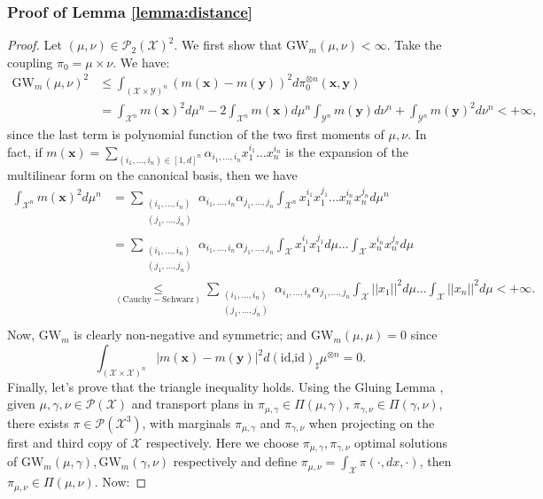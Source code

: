 \documentclass{article}
\newcommand{\Y}{\mathcal{Y}}
\newcommand{\X}{\mathcal{X}}
\newcommand{\1}{\mathbf{1}}
\newcommand{\GW}{\mathrm{GW}}
\renewcommand{\P}{\mathcal{P}}
\theoremstyle{definition}
\theoremstyle{remark}
\begin{document}
\begin{appendices}
\subsubsection*{Proof of Lemma \ref{lemma:distance}}
\begin{proof}Let $(\mu,\nu)\in 
    \P_2(\X)^2$. We first show that $\GW_m(\mu,\nu)<\infty$. Take the coupling $\pi_0 = \mu\times\nu$. We have:
    \begin{equation*}
        \begin{split}
            \GW_m(\mu,\nu)^2&\leq\int_{(\X\times\Y)^{n}}(m(\mathbf{x})-m(\mathbf{y}))^2d\pi_0^{\otimes n}(\mathbf{x},\mathbf{y})\\
            &=\int_{\X^{n}}m(\mathbf{x})^2d\mu^n-2\int_{\X^{n}}m(\mathbf{x})d\mu^n\int_{\Y^{n}}m(\mathbf{y})d\nu^n+\int_{\Y^{n}}m(\mathbf{y})^2d\nu^n<+\infty,
        \end{split}
    \end{equation*}
    since the last term is polynomial function of the two first moments of $\mu,\nu$. In fact, if $m(\mathbf{x})=\sum_{(i_1,\dots,i_n)\in [1,d]^n}\alpha_{i_1,\dots,i_n}x_1^{i_1}\dots x_n^{i_n}$ is the expansion of the multilinear form on the canonical basis, then we have 
    \begin{equation*}
        \begin{split}
            \int_{\X^n}m(\mathbf{x})^2d\mu^{ n}
            &=\sum_{\substack{(i_1,\dots,i_n)\\(j_1,\dots,j_n)}}\alpha_{i_1,\dots,i_n}\alpha_{j_1,\dots,j_n}\int_{\X^n}x_1^{i_1}x_1^{j_1}\dots x_n^{i_n} x_n^{j_n}d\mu^n\\
            &=\sum_{\substack{(i_1,\dots,i_n)\\(j_1,\dots,j_n)}}\alpha_{i_1,\dots,i_n}\alpha_{j_1,\dots,j_n}\int_{\X}x_1^{i_1}x_1^{j_1}d\mu\dots \int_{\X}x_n^{i_n}x_n^{j_n}d\mu\\
            &\underset{\mathrm{(Cauchy-Schwarz)}}{\leq} \sum_{\substack{(i_1,\dots,i_n)\\(j_1,\dots,j_n)}}\alpha_{i_1,\dots,i_n}\alpha_{j_1,\dots,j_n}\int_{\X}||x_1||^2d\mu\dots \int_{\X}||x_n||^2d\mu<+\infty.\\
        \end{split}
    \end{equation*}
    Now, $\GW_m$ is clearly non-negative and symmetric; and $\GW_m(\mu,\mu)=0$ since\[\int_{(\X\times\X)^n}|m(\mathbf{x})-m(\mathbf{y})|^2d(\textrm{id,id})_\sharp\mu^{\otimes n} = 0.\]
    Finally, let's prove that the triangle inequality holds. Using the Gluing Lemma \cite[Theorem 1.1.10]{dudley2014uniform}, given $\mu,\gamma,\nu\in \P(\X)$ and transport plans in $\pi_{\mu,\gamma}\in \Pi(\mu,\gamma)$, $\pi_{\gamma,\nu}\in \Pi(\gamma,\nu)$, there exists $\pi\in \P(\X^3)$, with marginals $\pi_{\mu,\gamma}$ and $\pi_{\gamma,\nu}$ when projecting on the first and third copy of $\X$ respectively. Here we choose $\pi_{\mu,\gamma},\pi_{\gamma,\nu}$ optimal solutions of $\GW_m(\mu,\gamma),\GW_m(\gamma,\nu)$ respectively and define  $\pi_{\mu,\nu}=\int_\X \pi(\cdot,dx,\cdot)$, then $\pi_{\mu,\nu}\in \Pi(\mu,\nu)$. Now:

\end{proof}
\end{appendices}
\end{document}
